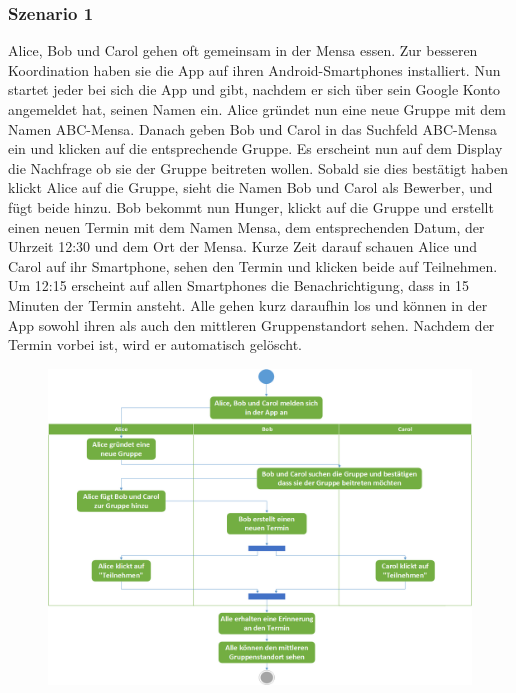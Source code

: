 \documentclass{scrartcl}
\begin{document}
	\subsubsection{Szenario 1}
	Alice, Bob und Carol gehen oft gemeinsam in der Mensa essen. Zur besseren Koordination haben sie die App auf ihren Android-Smartphones installiert.
	Nun startet jeder bei sich die App und gibt, nachdem er sich über sein Google Konto angemeldet hat, seinen Namen ein.
	Alice gründet nun eine neue Gruppe mit dem Namen ABC-Mensa. Danach geben Bob und Carol in das Suchfeld ABC-Mensa ein und klicken auf die entsprechende Gruppe.
	Es erscheint nun auf dem Display die Nachfrage ob sie der Gruppe beitreten wollen. Sobald sie dies bestätigt haben klickt Alice auf die Gruppe,
	sieht die Namen Bob und Carol als Bewerber, und fügt beide hinzu.
	Bob bekommt nun Hunger, klickt auf die Gruppe und erstellt einen neuen Termin mit dem Namen Mensa, dem entsprechenden Datum, der Uhrzeit 12:30 und dem Ort der Mensa.
	Kurze Zeit darauf schauen Alice und Carol auf ihr Smartphone, sehen den Termin und klicken beide auf \glqq{}Teilnehmen\grqq{}.
	Um 12:15 erscheint auf allen Smartphones die Benachrichtigung, dass in 15 Minuten der Termin ansteht.
	Alle gehen kurz daraufhin los und können in der App sowohl ihren als auch den mittleren Gruppenstandort sehen.
	Nachdem der Termin vorbei ist, wird er automatisch gelöscht.
	\newline
	\newline
	\begin{figure}[h]
	\centering
	\includegraphics[width=\textwidth]{Szenario1}
	\end{figure}
	
\end{document}
